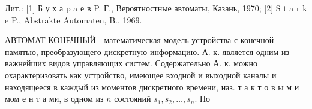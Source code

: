 \documentclass[10pt]{article}
\begin{document}
Лит.: [1] Б у х а p a е в P. Г., Вероятностные автоматы, Казань, 1970; [2] S t a r k e P., Abstrakte Automaten, B., 1969.



АВТОМАТ КОНЕЧНЫЙ - математическая модель устройства с конечной памятью, преобразующего дискретную информацию. А. к. является одним из важнейших видов управляющих систем. Содержательно А. к. можно охарактеризовать как устройство, имеющее входной и выходной каналы и находящееся в каждый из моментов дискретного времени, наз. т а к т о в ы м и мом е н т а ми, в одном из $n$ состояний $s_{1}, s_{2}, \ldots, s_{n}$. По
\end{document}
